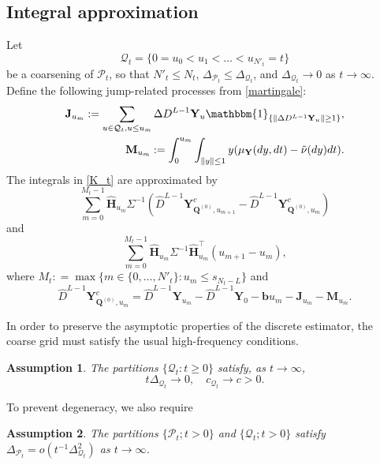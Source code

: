 \documentclass[12pt]{amsart}
\newtheorem{assumption}{Assumption}[section]
\numberwithin{equation}{section}
\newcommand{\1}{\mathbf{1}}
\begin{document}
\subsection{Integral approximation} \label{Integral approximation}\cite[Section 4.1]{lucchese2026estimation}
Let
\begin{equation*}
    \mathcal{Q}_t=\{0=u_0<u_1<\dots<u_{N'_t}=t\}
\end{equation*}
be a coarsening of $\mathcal{P}_t$, so that $N'_t\leq N_t$, $\Delta_{\mathcal{P}_t}\leq\Delta_{\mathcal{Q}_t}$, and $\Delta_{\mathcal{Q}_t}\to 0$ as $t\to\infty$. Define the following jump-related processes from \eqref{martingale}:
\begin{align*}
\mathbf{J}_{u_m}:=\sum_{\substack{u\in\mathcal{Q}_t,u\leq u_m}}\Delta D^{L-1}\mathbf{Y}_u\mathbbm{1}_{\{\Vert \Delta D^{L-1}\mathbf{Y}_u\Vert\geq 1\}},\\
\mathbf{M}_{u_m}:= \int_0^{u_m}\int_{\Vert y \Vert\leq 1}y(\mu_\mathbf{Y}(dy,dt)-\tilde{\nu}(dy)dt).
\end{align*}
The integrals in \eqref{K_t} are approximated by
\begin{equation*}
    \sum_{m=0}^{M_t-1}\hat{\mathbf{H}}_{u_m}\Sigma^{-1}\left(\hat{D}^{L-1}\mathbf{Y}_{\mathbf{Q}^{(0)},u_{m+1}}^{c}-\hat{D}^{L-1}\mathbf{Y}_{\mathbf{Q}^{(0)},u_{m}}^{c}\right)
\end{equation*}
and
\begin{equation*}
    \sum_{m=0}^{M_t-1}\hat{\mathbf{H}}_{u_m}\Sigma^{-1}\hat{\mathbf{H}}_{u_m}^{\top}(u_{m+1}-u_m),
\end{equation*}
where $M_t: = \max\{m\in\{0,\dots,N'_t\}:u_m\leq s_{N_t-L}\}$ and 
\begin{equation}
\label{martingaleY}
    \hat{D}^{L-1}\mathbf{Y}_{\mathbf{Q}^{(0)},u_{m}}^{c} = \hat{D}^{L-1}\mathbf{Y}_{u_m} - \hat{D}^{L-1}\mathbf{Y}_{0}-\mathbf{b}u_m-\mathbf{J}_{u_m}-\mathbf{M}_{u_m}.
\end{equation}

In order to preserve the asymptotic properties of the discrete estimator, the coarse grid must satisfy the usual high-frequency conditions.
\begin{assumption}
\label{assumptionB2}
The partitions $\{\mathcal{Q}_t:t\ge 0\}$ satisfy, as $t\to\infty$,
\begin{equation*}
    t\Delta_{\mathcal{Q}_t}\to 0,\quad c_{\mathcal{Q}_t}\to c>0.
\end{equation*}
\end{assumption}
To prevent degeneracy, we also require
\begin{assumption}
\label{P_Q}
    The partitions $\{\mathcal{P}_t;t>0\}$ and $\{\mathcal{Q}_t;t>0\}$ satisfy $\Delta_{\mathcal{P}_t}=o(t^{-1}\Delta^2_{\mathcal{Q}_t})$ as $t\to\infty$.
\end{assumption}
\end{document}
